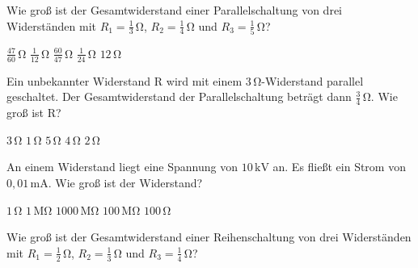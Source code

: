 \documentclass[11pt]{exam}
\begin{document}
\setlength{\voffset}{-0.5in}
\setlength{\headsep}{5pt}

\hspace{2mm}
 \hspace{5mm}
\vspace{4mm}

\begin{questions}

\question Wie groß ist der Gesamtwiderstand einer Parallelschaltung von drei Widerständen mit \(R_1=\mathrm{\frac{1}{3}\,\Omega}\), \(R_2=\mathrm{\frac{1}{4}\,\Omega}\) und \(R_3=\mathrm{\frac{1}{5}\,\Omega}\)?

\begin{choices}
	\choice \(\mathrm{\frac{47}{60}\,\Omega}\)
	\choice \(\mathrm{\frac{1}{12}\,\Omega}\)
	\choice \(\mathrm{\frac{60}{47}\,\Omega}\)
	\choice \(\mathrm{\frac{1}{24}\,\Omega}\)
	\choice \(\mathrm{12\,\Omega}\)
\end{choices}

\vspace{3mm}\question Ein unbekannter Widerstand \(\mathrm{R}\) wird mit einem \(\mathrm{3\,\Omega}\)-Widerstand parallel geschaltet. Der Gesamtwiderstand der Parallelschaltung beträgt dann \(\mathrm{\frac{3}{4}\,\Omega}\). Wie groß ist \(\mathrm{R}\)?

\begin{choices}
	\choice \(\mathrm{3\,\Omega}\)
	\choice \(\mathrm{1\,\Omega}\)
	\choice \(\mathrm{5\,\Omega}\)
	\choice \(\mathrm{4\,\Omega}\)
	\choice \(\mathrm{2\,\Omega}\)
\end{choices}

\vspace{3mm}\question An einem Widerstand liegt eine Spannung von \(10\,\mathrm{kV}\) an. Es fließt ein Strom von \(\mathrm{0,01\,mA}\). Wie groß ist der Widerstand?

\begin{choices}
	\choice \(\mathrm{1\,\Omega}\)
	\choice \(\mathrm{1\,M\Omega}\)
	\choice \(\mathrm{1000\,M\Omega}\)
	\choice \(\mathrm{100\,M\Omega}\)
	\choice \(\mathrm{100\,\Omega}\)
\end{choices}

\vspace{3mm}\question Wie groß ist der Gesamtwiderstand einer Reihenschaltung von drei Widerständen mit \(R_1=\mathrm{\frac{1}{2}\,\Omega}\), \(R_2=\mathrm{\frac{1}{3}\,\Omega}\) und \(R_3=\mathrm{\frac{1}{4}\,\Omega}\)?


\end{questions}
\end{document}
